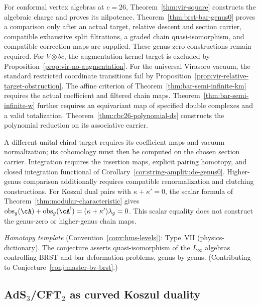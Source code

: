 \begin{remark}[Scope]\label{rem:anomaly-scope}
For conformal vertex algebras at $c=26$, Theorem~\ref{thm:vir-square} constructs the algebraic charge and proves its nilpotence.
Theorem~\ref{thm:brst-bar-genus0} proves a comparison only after an actual target, relative descent and section carrier, compatible exhaustive split filtrations, a graded chain quasi-isomorphism, and compatible correction maps are supplied.
These genus-zero constructions remain required.
For $V\otimes bc$, the augmentation-kernel target is excluded by Proposition~\ref{prop:vir-no-augmentation}.
For the universal Virasoro vacuum, the standard restricted coordinate transitions fail by Proposition~\ref{prop:vir-relative-target-obstruction}.
The affine criterion of Theorem~\ref{thm:bar-semi-infinite-km} requires the actual coefficient and filtered chain maps.
Theorem~\ref{thm:bar-semi-infinite-w} further requires an equivariant map of specified double complexes and a valid totalization.
Theorem~\ref{thm:cbc26-polynomial-ds} constructs the polynomial reduction on its associative carrier.

A different unital chiral target requires its coefficient maps and vacuum normalization; its cohomology must then be computed on the chosen section carrier.
Integration requires the insertion maps, explicit pairing homotopy, and closed integration functional of Corollary~\ref{cor:string-amplitude-genus0}.
Higher-genus comparison additionally requires compatible renormalization and clutching constructions.
For Koszul dual pairs with $\kappa+\kappa'=0$, the scalar formula of Theorem~\ref{thm:modular-characteristic} gives
$\mathrm{obs}_g(\cA)+\mathrm{obs}_g(\cA^!)=(\kappa+\kappa')\lambda_g=0$.
This scalar equality does not construct the genus-zero or higher-genus chain maps.

\emph{Homotopy template} (Convention~\ref{conv:hms-levels}): Type~VII (physics-dictionary).
The conjecture asserts quasi-isomorphism of the $L_\infty$ algebras
controlling BRST and bar deformation problems, genus by genus.
(Contributing to Conjecture~\ref{conj:master-bv-brst}.)
\end{remark}

\subsection{\texorpdfstring{AdS$_3$/CFT$_2$ as curved Koszul duality}{AdS3/CFT2 as curved Koszul duality}}
\label{subsec:ads-cft-koszul}

